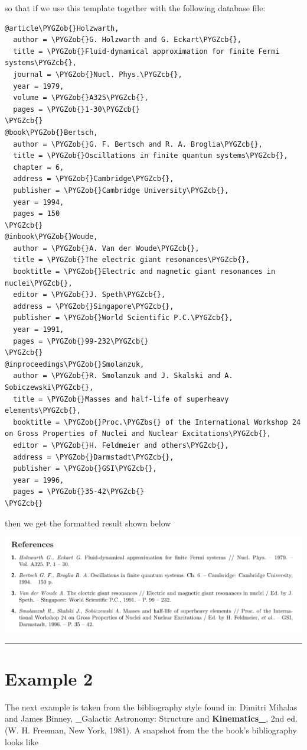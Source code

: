 \documentclass[letterpaper,10pt,english]{sphinxmanual}
\def\PYGZbs{\char`\\}
\def\PYGZob{\char`\{}
\def\PYGZcb{\char`\}}
\begin{document}
so that if we use this template together with the following database file:

\begin{Verbatim}[commandchars=\\\{\}]
@article\PYGZob{}Holzwarth,
  author = \PYGZob{}G. Holzwarth and G. Eckart\PYGZcb{},
  title = \PYGZob{}Fluid-dynamical approximation for finite Fermi systems\PYGZcb{},
  journal = \PYGZob{}Nucl. Phys.\PYGZcb{},
  year = 1979,
  volume = \PYGZob{}A325\PYGZcb{},
  pages = \PYGZob{}1-30\PYGZcb{}
\PYGZcb{}
@book\PYGZob{}Bertsch,
  author = \PYGZob{}G. F. Bertsch and R. A. Broglia\PYGZcb{},
  title = \PYGZob{}Oscillations in finite quantum systems\PYGZcb{},
  chapter = 6,
  address = \PYGZob{}Cambridge\PYGZcb{},
  publisher = \PYGZob{}Cambridge University\PYGZcb{},
  year = 1994,
  pages = 150
\PYGZcb{}
@inbook\PYGZob{}Woude,
  author = \PYGZob{}A. Van der Woude\PYGZcb{},
  title = \PYGZob{}The electric giant resonances\PYGZcb{},
  booktitle = \PYGZob{}Electric and magnetic giant resonances in nuclei\PYGZcb{},
  editor = \PYGZob{}J. Speth\PYGZcb{},
  address = \PYGZob{}Singapore\PYGZcb{},
  publisher = \PYGZob{}World Scientific P.C.\PYGZcb{},
  year = 1991,
  pages = \PYGZob{}99-232\PYGZcb{}
\PYGZcb{}
@inproceedings\PYGZob{}Smolanzuk,
  author = \PYGZob{}R. Smolanzuk and J. Skalski and A. Sobiczewski\PYGZcb{},
  title = \PYGZob{}Masses and half-life of superheavy elements\PYGZcb{},
  booktitle = \PYGZob{}Proc.\PYGZbs{} of the International Workshop 24 on Gross Properties of Nuclei and Nuclear Excitations\PYGZcb{},
  editor = \PYGZob{}H. Feldmeier and others\PYGZcb{},
  address = \PYGZob{}Darmstadt\PYGZcb{},
  publisher = \PYGZob{}GSI\PYGZcb{},
  year = 1996,
  pages = \PYGZob{}35-42\PYGZcb{}
\PYGZcb{}
\end{Verbatim}

then we get the formatted result shown below

\includegraphics[width=0.600\linewidth]{example1b.png}


\bigskip\hrule{}\bigskip



\section{Example 2}
\label{examples:example-2}
The next example is taken from the bibliography style found in: Dimitri Mihalas and James Binney, \_Galactic Astronomy: Structure and {\color{red}\bfseries{}Kinematics\_}, 2nd ed. (W. H. Freeman, New York, 1981). A snapshot from the the book's bibliography looks like
\end{document}
